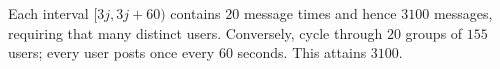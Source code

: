 Each interval $[3j,3j+60)$ contains $20$ message times and hence $3100$ messages, requiring that many distinct users. Conversely, cycle through $20$ groups of $155$ users; every user posts once every $60$ seconds. This attains $\boxed{3100}$.
